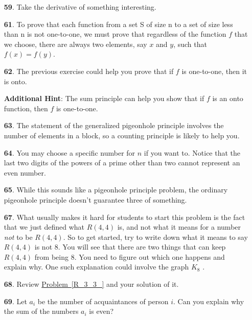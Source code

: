 \documentclass[10pt,]{book}
\theoremstyle{plain}
\theoremstyle{definition}
\theoremstyle{definition}
\numberwithin{equation}{chapter}
\begin{document}
\begin{itemize}[itemsep=1em]
\item[\textbf{59}.]Take the derivative of something interesting.%

\item[\textbf{61}.]To prove that each function from a set S of size n to a set of size less than n is not one-to-one, we must prove that regardless of the function \(f\) that we choose, there are always two elements, say \(x\) and \(y\), such that \(f(x) = f(y)\).%

\item[\textbf{62}.]The previous exercise could help you prove that if \(f\) is one-to-one, then it is onto.%

\par\smallskip
\noindent\textbf{Additional Hint}: The sum principle can help you show that if \(f\) is an onto function, then \(f\) is one-to-one.%

\item[\textbf{63}.]The statement of the generalized pigeonhole principle involves the number of elements in a block, so a counting principle is likely to help you.%

\item[\textbf{64}.]You may choose a specific number for \(n\) if you want to. Notice that the last two digits of the powers of a prime other than two cannot represent an even number.%

\item[\textbf{65}.]While this sounds like a pigeonhole principle problem, the ordinary pigeonhole principle doesn't guarantee three of something.%

\item[\textbf{67}.]What usually makes it hard for students to start this problem is the fact that we just defined what \(R(4, 4)\) is, and not what it means for a number \emph{not} to be \(R(4, 4)\). So to get started, try to write down what it means to say \(R(4, 4)\) is not 8. You will see that there are two things that can keep \(R(4, 4)\) from being 8. You need to figure out which one happens and explain why. One such explanation could involve the graph \(K_8\) .%

\item[\textbf{68}.]Review \hyperref[R_3_3_]{Problem~\ref{R_3_3_}} and your solution of it.%

\item[\textbf{69}.]Let \(a_i\) be the number of acquaintances of person \(i\). Can you explain why the sum of the numbers \(a_i\) is even?%


\end{itemize}
\end{document}
